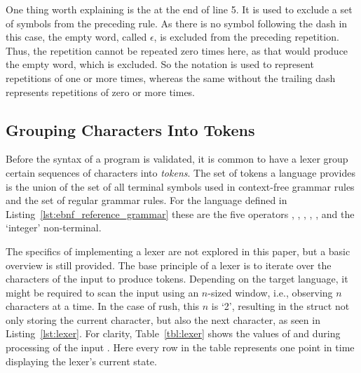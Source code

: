 One thing worth explaining is the \qVerb{-} at the end of line 5.
It is used to exclude a set of symbols from the preceding rule.
As there is no symbol following the dash in this case, the empty word, called $\epsilon$, is excluded from the preceding repetition.
Thus, the repetition cannot be repeated zero times here, as that would produce the empty word, which is excluded.
So the notation  is used to represent repetitions of one or more times, whereas the same without the trailing dash represents repetitions of zero or more times.

\subsection{Grouping Characters Into Tokens}

Before the syntax of a program is validated, it is common to have a lexer group certain sequences of characters into \emph{tokens}.
The set of tokens a language provides is the union of the set of all terminal symbols used in context-free grammar rules and the set of regular grammar rules.
For the language defined in Listing~\ref{lst:ebnf_reference_grammar} these are the five operators \qVerb{+}, \qVerb{-}, \qVerb{*}, \qVerb{/}, \qVerb{**}, and the `integer' non-terminal.


The specifics of implementing a lexer are not explored in this paper, but a basic overview is still provided.
The base principle of a lexer is to iterate over the characters of the input to produce tokens.
Depending on the target language, it might be required to scan the input using an $n$-sized window, i.e., observing $n$ characters at a time.
In the case of rush, this $n$ is `2', resulting in the  struct not only storing the current character, but also the next character, as seen in Listing~\ref{lst:lexer}.
For clarity, Table~\ref{tbl:lexer} shows the values of  and  during processing of the input .
Here every row in the table represents one point in time displaying the lexer's current state.

